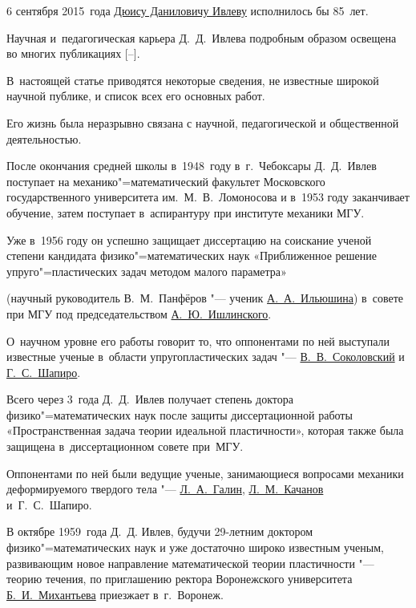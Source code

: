 6 сентября 2015~года \href{https://goo.gl/n4p3U9}{Дюису Даниловичу Ивлеву} исполнилось бы 85~лет. 

Научная и~педагогическая карьера Д.~Д.~Ивлева подробным образом освещена во многих публикациях [--]. 

В~настоящей статье приводятся некоторые сведения, не известные широкой научной публике, и список всех его основных работ.





Его жизнь была неразрывно связана с научной, педагогической и общественной деятельностью. 

После окончания средней школы в~1948~году в~г.~Чебоксары Д.~Д.~Ивлев поступает на механико"=математический факультет Московского государственного университета им.~М.~В.~Ломоносова и в~1953 году заканчивает обучение, затем поступает в~аспирантуру при институте механики МГУ. 

Уже в~1956 году он успешно защищает диссертацию на соискание ученой степени кандидата физико"=математических наук «Приближенное решение упруго"=пластических задач методом малого параметра» 

(научный руководитель В.~М.~Панфёров "--- ученик \href{https://goo.gl/4YQmub}{А.~А.~Ильюшина}) в~совете при МГУ под председательством \href{https://goo.gl/FMKLdq}{А.~Ю.~Ишлинского}. 

О~научном уровне его работы говорит то, что оппонентами по ней выступали известные ученые в~области упругопластических задач "--- \href{https://goo.gl/AEtBMi}{В.~В.~Соколовский} и \href{http://letopis.msu.ru/peoples/2575}{Г.~С.~Шапиро}. 

Всего через 3~года Д.~Д.~Ивлев получает степень доктора физико"=математических наук после защиты диссертационной работы «Пространственная задача теории идеальной пластичности», которая также была защищена в~диссертационном совете при~МГУ. 

Оппонентами по ней были ведущие ученые, занимающиеся вопросами механики деформируемого твердого тела "--- \href{https://goo.gl/wdnwB2}{Л.~А.~Галин}, \href{http://www.worldcat.org/identities/lccn-n84141111/}{Л.~М.~Качанов} и~Г.~С.~Шапиро.



В октябре 1959~года Д.~Д. Ивлев, будучи 29-летним доктором физико"=математических наук и уже достаточно широко известным ученым, развивающим новое направление математической теории пластичности "--- теорию течения, по приглашению ректора Воронежского университета \href{https://vrnguide.ru/bio-dic/m/mikhantev-boris-ivanovich.html}{Б.~И.~Михантьева} приезжает в~г.~Воронеж. 

